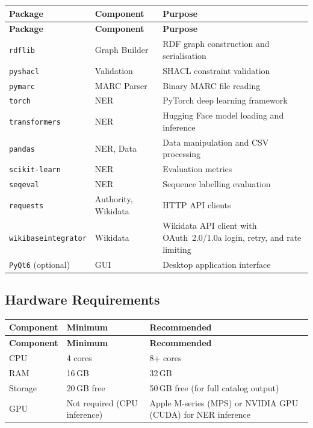 \documentclass[12pt]{article}
\newcommand{\code}[1]{\texttt{#1}}
\begin{document}
\begin{longtable}{|l|l|p{6cm}|}
\hline
\textbf{Package} & \textbf{Component} & \textbf{Purpose} \\
\hline
\endfirsthead
\hline
\textbf{Package} & \textbf{Component} & \textbf{Purpose} \\
\hline
\endhead
\hline
\endfoot
\code{rdflib} & Graph Builder & RDF graph construction and serialisation \\
\hline
\code{pyshacl} & Validation & SHACL constraint validation \\
\hline
\code{pymarc} & MARC Parser & Binary MARC file reading \\
\hline
\code{torch} & NER & PyTorch deep learning framework \\
\hline
\code{transformers} & NER & Hugging Face model loading and inference \\
\hline
\code{pandas} & NER, Data & Data manipulation and CSV processing \\
\hline
\code{scikit-learn} & NER & Evaluation metrics \\
\hline
\code{seqeval} & NER & Sequence labelling evaluation \\
\hline
\code{requests} & Authority, Wikidata & HTTP API clients \\
\hline
\code{wikibaseintegrator} & Wikidata & Wikidata API client with OAuth~2.0/1.0a login, retry, and rate limiting \\
\hline
\code{PyQt6} (optional) & GUI & Desktop application interface \\
\hline
\end{longtable}

\subsection{Hardware Requirements}

\begin{longtable}{|l|p{5cm}|p{5cm}|}
\hline
\textbf{Component} & \textbf{Minimum} & \textbf{Recommended} \\
\hline
\endfirsthead
\hline
\textbf{Component} & \textbf{Minimum} & \textbf{Recommended} \\
\hline
\endhead
\hline
\endfoot
CPU & 4 cores & 8+ cores \\
\hline
RAM & 16\,GB & 32\,GB \\
\hline
Storage & 20\,GB free & 50\,GB free (for full catalog output) \\
\hline
GPU & Not required (CPU inference) & Apple M-series (MPS) or NVIDIA GPU (CUDA) for NER inference \\
\hline
\end{longtable}
\end{document}

